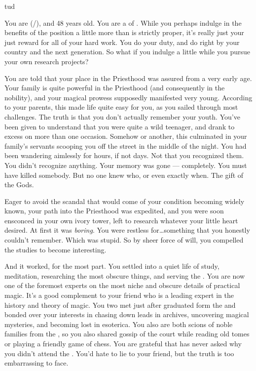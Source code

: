 tud\documentclass[char]{GL2020}
\begin{document}
\name{\cHedonist{}}

You are \cHedonist{\full} (\cHedonist{\they}/\cHedonist{\them}), and 48 years old. You are a \cHedonist{\cleric} of \cFarmGod{}. While you perhaps indulge in the benefits of the position a little more than is strictly proper, it’s really just your just reward for all of your hard work. You do your duty, and do right by your country and the next generation. So what if you indulge a little while you pursue your own research projects?

You are told that your place in the Priesthood was assured from a very early age. Your family is quite powerful in the Priesthood (and consequently in the nobility), and your magical prowess supposedly manifested very young. According to your parents, this made life quite easy for you, as you sailed through most challenges. The truth is that you don’t actually remember your youth. You’ve been given to understand that you were quite a wild teenager, and drank to excess on more than one occasion. Somehow or another, this culminated in your family’s servants scooping you off the street in the middle of the night. You had been wandering aimlessly for hours, if not days. Not that you recognized them. You didn’t recognize anything. Your memory was gone — completely. You must have killed somebody. But no one knew who, or even exactly when. The gift of the Gods.

Eager to avoid the scandal that would come of your condition becoming widely known, your path into the Priesthood was expedited, and you were soon ensconced in your own ivory tower, left to research whatever your little heart desired. At first it was \emph{boring}. You were restless for\ldots something that you honestly couldn’t remember. Which was stupid. So by sheer force of will, you compelled the studies to become interesting.

And it worked, for the most part. You settled into a quiet life of study, meditation, researching the most obscure things, and serving the \pFarmers{}. You are now one of the foremost experts on  the most niche and obscure details of practical magic. It’s a good complement to your friend \cWildCard{} who is a leading expert in the history and theory of magic. You two met just after \cWildcard{\they} graduated form the \pSchool{} and bonded over your interests in chasing down leads in archives, uncovering magical mysteries, and becoming lost in esoterica. You also are both scions of noble families from the \pFarm{}, so you also shared gossip of the court while reading old tomes or playing a friendly game of chess. You are grateful that \cWildcard{} has never asked why you didn’t attend the \pSc{}. You’d hate to lie to your friend, but the truth is too embarrassing to face.
\end{document}

